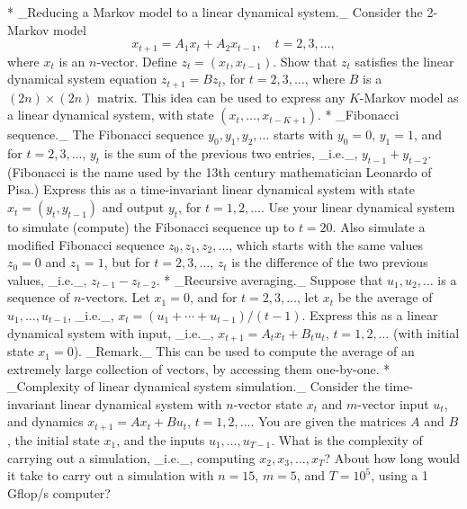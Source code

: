 * _Reducing a Markov model to a linear dynamical system._ Consider the 2-Markov model \[x_{t+1}=A_{1}x_{t}+A_{2}x_{t-1},\quad t=2,3,\ldots,\] where \(x_{t}\) is an \(n\)-vector. Define \(z_{t}=(x_{t},x_{t-1})\). Show that \(z_{t}\) satisfies the linear dynamical system equation \(z_{t+1}=Bz_{t}\), for \(t=2,3,\ldots\), where \(B\) is a \((2n)\times(2n)\) matrix. This idea can be used to express any \(K\)-Markov model as a linear dynamical system, with state \((x_{t},\ldots,x_{t-K+1})\).
* _Fibonacci sequence._ The Fibonacci sequence \(y_{0},y_{1},y_{2},\ldots\) starts with \(y_{0}=0\), \(y_{1}=1\), and for \(t=2,3,\ldots\), \(y_{t}\) is the sum of the previous two entries, _i.e._, \(y_{t-1}+y_{t-2}\). (Fibonacci is the name used by the 13th century mathematician Leonardo of Pisa.) Express this as a time-invariant linear dynamical system with state \(x_{t}=(y_{t},y_{t-1})\) and output \(y_{t}\), for \(t=1,2,\ldots\). Use your linear dynamical system to simulate (compute) the Fibonacci sequence up to \(t=20\). Also simulate a modified Fibonacci sequence \(z_{0},z_{1},z_{2},\ldots\), which starts with the same values \(z_{0}=0\) and \(z_{1}=1\), but for \(t=2,3,\ldots\), \(z_{t}\) is the difference of the two previous values, _i.e._, \(z_{t-1}-z_{t-2}\).
* _Recursive averaging._ Suppose that \(u_{1},u_{2},\ldots\) is a sequence of \(n\)-vectors. Let \(x_{1}=0\), and for \(t=2,3,\ldots\), let \(x_{t}\) be the average of \(u_{1},\ldots,u_{t-1}\), _i.e._, \(x_{t}=(u_{1}+\cdots+u_{t-1})/(t-1)\). Express this as a linear dynamical system with input, _i.e._, \(x_{t+1}=A_{t}x_{t}+B_{t}u_{t}\), \(t=1,2,\ldots\) (with initial state \(x_{1}=0\)). _Remark._ This can be used to compute the average of an extremely large collection of vectors, by accessing them one-by-one.
* _Complexity of linear dynamical system simulation._ Consider the time-invariant linear dynamical system with \(n\)-vector state \(x_{t}\) and \(m\)-vector input \(u_{t}\), and dynamics \(x_{t+1}=Ax_{t}+Bu_{t}\), \(t=1,2,\ldots\). You are given the matrices \(A\) and \(B\), the initial state \(x_{1}\), and the inputs \(u_{1},\ldots,u_{T-1}\). What is the complexity of carrying out a simulation, _i.e._, computing \(x_{2},x_{3},\ldots,x_{T}\)? About how long would it take to carry out a simulation with \(n=15\), \(m=5\), and \(T=10^{5}\), using a 1 Gflop/s computer? 